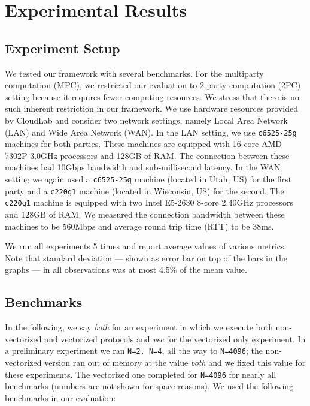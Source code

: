 \section{Experimental Results}
\label{sec:results}

\subsection{Experiment Setup}\label{sec:experiment_setup}
We tested our framework with several benchmarks. For the multiparty computation (MPC), we restricted our evaluation to 2 party computation (2PC) setting because it requires fewer computing resources. We stress that there is no such inherent restriction in our framework. We use hardware resources provided by CloudLab\cite{DuplyakinATC19} and consider two network settings, namely Local Area Network (LAN) and Wide Area Network (WAN). In the LAN setting, we use {\tt c6525-25g} machines for both parties. These machines are equipped with 16-core AMD 7302P 3.0GHz processors and 128GB of RAM. The connection between these machines had 10Gbps bandwidth and sub-millisecond latency. %
In the WAN setting we again used a {\tt c6525-25g} machine (located in Utah, US) for the first party and a {\tt c220g1} machine (located in Wisconsin, US) for the second. The {\tt c220g1} machine is equipped with two Intel E5-2630 8-core 2.40GHz processors and 128GB of RAM. We measured the connection bandwidth between these machines to be 560Mbps and average round trip time (RTT) to be 38ms. %

We run all experiments 5 times and report average values of various metrics. Note that standard deviation --- shown as error bar on top of the bars in the graphs --- in all observations was at most 4.5\% of the mean value. %

\subsection{Benchmarks}\label{sec:benchmarks_description}
In the following, we say {\em both} for an experiment in which we execute both non-vectorized and vectorized protocols and {\em vec} for the vectorized only experiment. 
In a preliminary experiment we ran {\tt N=2, N=4}, all the way to {\tt N=4096}; the non-vectorized version ran out of memory at the value {\em both} and we fixed this value for these experiments. The vectorized one completed for {\tt N=4096} for nearly all benchmarks (numbers are not shown for space reasons).
We used the following benchmarks in our evaluation: 

